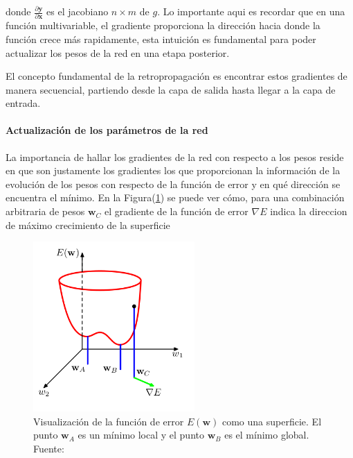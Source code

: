         donde $\frac{\partial \mathbf{y}}{\partial \mathbf{x}}$ es el jacobiano $n \times m$ de $g$. Lo importante aqui 
        es recordar que en una función multivariable, el gradiente proporciona la dirección hacia donde la función crece 
        más rapidamente, esta intuición es fundamental para poder actualizar los pesos de la red en una etapa posterior.

        El concepto fundamental de la retropropagación es encontrar estos gradientes de manera secuencial, partiendo desde 
        la capa de salida hasta llegar a la capa de entrada. 

            \paragraph{Actualización de los parámetros de la red}
            La importancia de hallar los gradientes de la red con respecto a los pesos reside en que son justamente 
            los gradientes los que proporcionan la información de la evolución de los pesos con respecto de la función 
            de error y en qué dirección se encuentra el mínimo. En la Figura(\ref{fig:gradsup}) se puede ver cómo, para 
            una combinación arbitraria de pesos $\mathbf{w}_C$ el gradiente de la función de error $\nabla E$ indica 
            la direccion de máximo crecimiento de la superficie

            \begin{figure}[!h] 
                \centering
                \includegraphics[width=0.55\textwidth]{img/gradsup}
                \caption[Visualización de la función de error]{Visualización de la función de error $E(\mathbf{w})$ como una superficie. El punto $\mathbf{w}_A$ es un mínimo local y el punto $\mathbf{w}_B$ es el mínimo global. Fuente: \cite{Bishop2006} }
                \label{fig:gradsup}
            \end{figure}

